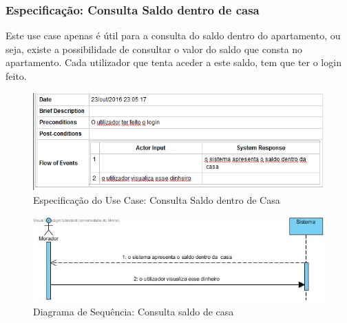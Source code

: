 \newpage \clearpage
\subsubsection{Especificação: Consulta Saldo dentro de casa }
Este use case apenas é útil para a consulta do saldo dentro do apartamento, ou seja, existe a possibilidade de consultar o valor do saldo que consta no apartamento. Cada utilizador que tenta aceder a este saldo, tem que ter o login feito.
\begin{figure}[htb!]
	\centering
	\includegraphics[scale=0.6]{imagens/Especificacoes/consultasaldodentrodecasa}  
	\caption{Especificação do Use Case: Consulta Saldo dentro de Casa   }  
\end{figure}

\begin{figure}[htb!]
	\centering
	\includegraphics[scale=0.5]{imagens/diagramaSeq/ConsultaSaldodeCasa}  
	\caption{Diagrama de Sequência: Consulta saldo de casa  }  
\end{figure}


